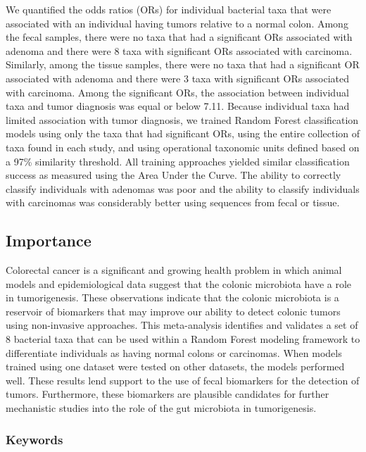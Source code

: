 \documentclass[12pt,]{article}
\begin{document}
We quantified the odds ratios (ORs) for individual bacterial taxa that
were associated with an individual having tumors relative to a normal
colon. Among the fecal samples, there were no taxa that had a
significant ORs associated with adenoma and there were 8 taxa with
significant ORs associated with carcinoma. Similarly, among the tissue
samples, there were no taxa that had a significant OR associated with
adenoma and there were 3 taxa with significant ORs associated with
carcinoma. Among the significant ORs, the association between individual
taxa and tumor diagnosis was equal or below 7.11. Because individual
taxa had limited association with tumor diagnosis, we trained Random
Forest classification models using only the taxa that had significant
ORs, using the entire collection of taxa found in each study, and using
operational taxonomic units defined based on a 97\% similarity
threshold. All training approaches yielded similar classification
success as measured using the Area Under the Curve. The ability to
correctly classify individuals with adenomas was poor and the ability to
classify individuals with carcinomas was considerably better using
sequences from fecal or tissue.

\newpage

\subsection{Importance}\label{importance}

Colorectal cancer is a significant and growing health problem in which
animal models and epidemiological data suggest that the colonic
microbiota have a role in tumorigenesis. These observations indicate
that the colonic microbiota is a reservoir of biomarkers that may
improve our ability to detect colonic tumors using non-invasive
approaches. This meta-analysis identifies and validates a set of 8
bacterial taxa that can be used within a Random Forest modeling
framework to differentiate individuals as having normal colons or
carcinomas. When models trained using one dataset were tested on other
datasets, the models performed well. These results lend support to the
use of fecal biomarkers for the detection of tumors. Furthermore, these
biomarkers are plausible candidates for further mechanistic studies into
the role of the gut microbiota in tumorigenesis.

\subsubsection{Keywords}\label{keywords}
\end{document}
